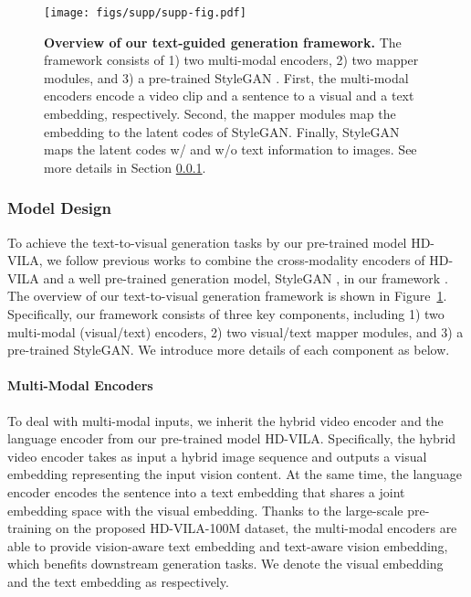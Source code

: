 \begin{figure}
    \centering
    \texttt{[image: figs/supp/supp-fig.pdf]}
    \caption{\textbf{Overview of our text-guided generation framework.}
    The framework consists of 1) two multi-modal encoders, 2) two mapper modules, and 3) a pre-trained StyleGAN \cite{karras2019stylegan}. First, the multi-modal encoders encode a video clip and a sentence to a visual and a text embedding, respectively. Second, the mapper modules map the embedding to the latent codes of StyleGAN. Finally, StyleGAN maps the latent codes w/ and w/o text information to images. See more details in Section \ref{sec:mapper}.}
    \label{fig:framework-gen}
\end{figure}

\subsubsection{Model Design}
\label{sec:mapper}
To achieve the text-to-visual generation tasks by our pre-trained model HD-VILA, we follow previous works to combine the cross-modality encoders of HD-VILA and a well pre-trained generation model, StyleGAN \cite{karras2019stylegan}, in our framework \cite{xia2021tedigan,patashnik2021styleclip}. The overview of our text-to-visual generation framework is shown in Figure~\ref{fig:framework-gen}. Specifically, our framework consists of three key components, including 1) two multi-modal (visual/text) encoders, 2) two visual/text mapper modules, and 3) a pre-trained StyleGAN. We introduce more details of each component as below. 

\paragraph{Multi-Modal Encoders} 
To deal with multi-modal inputs, we inherit the hybrid video encoder and the language encoder from our pre-trained model HD-VILA. Specifically, the hybrid video encoder takes as input a hybrid image sequence and outputs a visual embedding representing the input vision content. At the same time, the language encoder encodes the sentence into a text embedding that shares a joint embedding space with the visual embedding. Thanks to the large-scale pre-training on the proposed HD-VILA-100M dataset, the multi-modal encoders are able to provide vision-aware text embedding and text-aware vision embedding, which benefits downstream generation tasks. We denote the visual embedding and the text embedding as  respectively.


